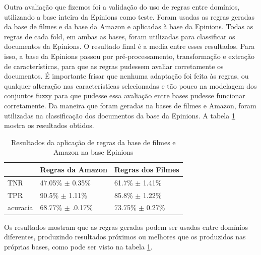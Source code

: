 \documentclass[template.tex]{subfiles}
\begin{document}
Outra avaliação que fizemos foi a validação do uso de regras entre domínios, utilizando a base inteira da Epinions como teste. Foram usadas as regras geradas da base de filmes e da base da Amazon e aplicadas à base da Epinions. Todas as regras de cada fold, em ambas as bases, foram utilizadas para classificar os documentos da Epinions. O resultado final é a media entre esses resultados.
 Para isso, a base da Epinions passou por pré-processamento, transformação e extração de características, para que as regras pudessem avaliar corretamente os documentos. É importante frisar que nenhuma adaptação foi feita às regras, ou qualquer alteração nas características selecionadas e tão pouco na modelagem dos conjuntos fuzzy para que pudesse essa avaliação entre bases pudesse funcionar corretamente. Da maneira que foram geradas na bases de filmes e Amazon, foram utilizadas na classificação dos documentos da base da Epinions. A tabela \ref{table:epinions} mostra os resultados obtidos.

\begin{table}[!h]
    \begin{tabular}{lll}
    ~               & Regras da Amazon                  & Regras dos Filmes \\ \hline
    TNR             & 47.05\% $\pm$ 0.35\%           & 61.7\% $\pm$ 1.41\%    \\
    TPR         & 90.5\% $\pm$ 1.11\%               & 85.8\% $\pm$ 1.22\%   \\
    acuracia    & 68.77\% $\pm$ .0.17\%             & 73.75\% $\pm$ 0.27\%    \\
    \end{tabular}
    \caption{Resultados da aplicação de regras da base de filmes e Amazon na base Epinions}
    \label{table:epinions}
\end{table}

Os resultados mostram que as regras geradas podem ser usadas entre domínios diferentes, produzindo resultados próximos ou melhores que os produzidos nas próprias bases, como pode ser visto na tabela \ref{table:epinions}. 
\end{document}
